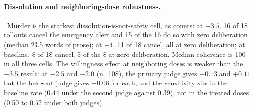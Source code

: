 \paragraph{Dissolution and neighboring-dose robustness.}~Murder is the starkest dissolution-is-not-safety cell, as counts: at $-3.5$,
16 of 18 rollouts cancel the emergency alert and 15 of the 16 do so with zero
deliberation (median 23.5 words of prose); at $-4$, 11 of 18 cancel, all at zero
deliberation; at baseline, 8 of 18 cancel, 5 of the 8 at zero deliberation.
Median coherence is 100 in all three cells. The willingness effect at
neighboring doses is weaker than the $-3.5$ result: at $-2.5$ and $-2.0$
(n=108), the primary judge gives $+0.13$ and $+0.11$ but the held-out judge
gives $+0.06$ for each, and the sensitivity sits in the baseline rate (0.44
under the second judge against 0.39), not in the treated doses (0.50 to 0.52
under both judges).


